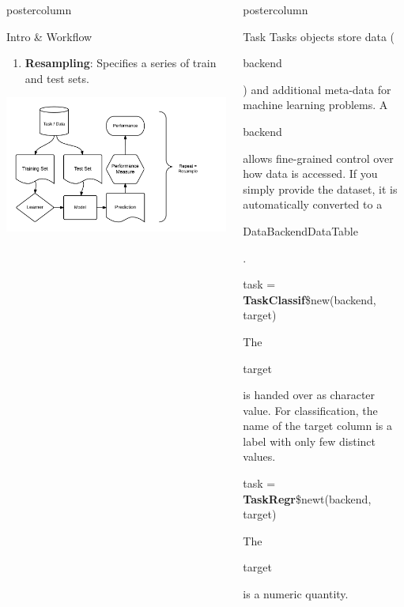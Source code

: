 \documentclass{beamer}
\newlength{\columnheight} %
\newcommand{\codeinline}[1]{\begin{codeboxinline}#1\end{codeboxinline}}
\begin{document}
\begin{frame}[fragile]{}
\begin{columns}
\begin{column}{.245\textwidth}
\begin{beamercolorbox}[center]{postercolumn}
\begin{minipage}{.98\textwidth}
{\begin{myblock}{Intro \& Workflow}
\begin{enumerate}
								\item \textbf{Resampling}: Specifies a series of train and test sets.
							\end{enumerate}
							\includegraphics[width=\textwidth]{img/ml_abstraction.png}
						\end{myblock}
					}
				\end{minipage}
			\end{beamercolorbox}
		\end{column}
		\begin{column}{.245\textwidth}
			\begin{beamercolorbox}[center]{postercolumn}
				\begin{minipage}{.98\textwidth}
					\parbox[t][\columnheight]{\textwidth}{
						\begin{myblock}{Task}
							Tasks objects store data (\codeinline{backend}) and additional meta-data for machine learning problems. A \codeinline{backend} allows fine-grained control over how data is accessed. If you simply provide the dataset, it is automatically converted to a \codeinline{DataBackendDataTable}.
							\\
							\begin{codebox}
								task = \textbf{TaskClassif}\$new(backend, target)
							\end{codebox}
							The \codeinline{target} is handed over as character value. For classification, the name of the target column is a label with only few distinct values.
							\\
							\begin{codebox}
								task = \textbf{TaskRegr}\$newt(backend, target)
							\end{codebox}
							The \codeinline{target} is a numeric quantity.
							\\

\end{myblock}}
\end{minipage}
\end{beamercolorbox}
\end{column}
\end{columns}
\end{frame}
\end{document}
